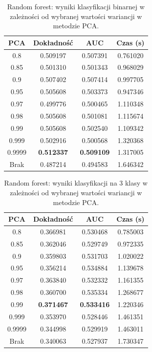 \documentclass[a4paper, twoside, 11pt, openright]{article}
\begin{document}
\begin{table}[H]
    \centering
    \begin{tabular}{|c|c|c|c|}
    \hline
        \textbf{PCA} & \textbf{Dokładność} & \textbf{AUC} & \textbf{Czas (s)} \\ \hline
0.8                &  0.509197 &  0.507391 &    0.761020 \\ \hline
0.85               &  0.501310 &  0.501343 &    0.968029 \\ \hline
0.9                &  0.507402 &  0.507414 &    0.997705 \\ \hline
0.95               &  0.505608 &  0.503373 &    0.947346 \\ \hline
0.97               &  0.499776 &  0.500465 &    1.110348 \\ \hline
0.98               &  0.505608 &  0.501081 &    1.115674 \\ \hline
0.99               &  0.505608 &  0.502540 &    1.109342 \\ \hline
0.999			   &  0.502916 &  0.500568 &    1.320368 \\ \hline
0.9999             &  \textbf{0.512337} &  \textbf{0.509109} &    1.317005 \\ \hline
Brak                &  0.487214 &  0.494583 &    1.646342 \\ \hline
    \end{tabular}
    \caption{Random forest: wyniki klasyfikacji binarnej w zależności od wybranej wartości wariancji w metodzie PCA.}
    \label{tab:rf_pca_binary}
\end{table}
\begin{table}[H]
    \centering
    \begin{tabular}{|c|c|c|c|}
    \hline
        \textbf{PCA} & \textbf{Dokładność} & \textbf{AUC} & \textbf{Czas (s)} \\ \hline
0.8                &  0.366981 &  0.530468 &    0.785003 \\ \hline
0.85               &  0.362046 &  0.529749 &    0.972335 \\ \hline
0.9                &  0.359803 &  0.531703 &    1.020022 \\ \hline
0.95               &  0.356214 &  0.534884 &    1.139678 \\ \hline
0.97               &  0.363840 &  0.532332 &    1.161355 \\ \hline
0.98               &  0.360700 &  0.535334 &    1.268677 \\ \hline
0.99               &  \textbf{0.371467} &  \textbf{0.533416} &    1.220346 \\ \hline
0.999		       &  0.353970 &  0.528446 &    1.461351 \\ \hline
0.9999             &  0.344998 &  0.529919 &    1.463011 \\ \hline
Brak                &  0.340063 &  0.527937 &    1.730347 \\ \hline
    \end{tabular}
    \caption{Random forest: wyniki klasyfikacji na 3 klasy w zależności od wybranej wartości wariancji w metodzie PCA.}
    \label{tab:rf_pca_discrete}
\end{table}
\end{document}
